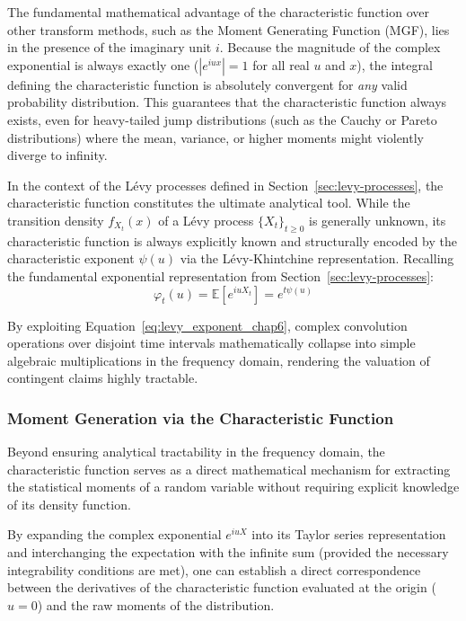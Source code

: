 The fundamental mathematical advantage of the characteristic function over other transform methods, such as the Moment Generating Function (MGF), lies in the presence of the imaginary unit $i$. Because the magnitude of the complex exponential is always exactly one ($|e^{iux}| = 1$ for all real $u$ and $x$), the integral defining the characteristic function is absolutely convergent for \textit{any} valid probability distribution. This guarantees that the characteristic function always exists, even for heavy-tailed jump distributions (such as the Cauchy or Pareto distributions) where the mean, variance, or higher moments might violently diverge to infinity.

In the context of the L\'evy processes defined in Section~\ref{sec:levy-processes}, the characteristic function constitutes the ultimate analytical tool. While the transition density $f_{X_t}(x)$ of a L\'evy process $\{X_t\}_{t \ge 0}$ is generally unknown, its characteristic function is always explicitly known and structurally encoded by the characteristic exponent $\psi(u)$ via the L\'evy-Khintchine representation. Recalling the fundamental exponential representation from Section~\ref{sec:levy-processes}:
\begin{equation}\label{eq:levy_exponent_chap6}
    \varphi_t(u) = \mathbb{E}[e^{iuX_t}] = e^{t\psi(u)}
\end{equation}

By exploiting Equation~\eqref{eq:levy_exponent_chap6}, complex convolution operations over disjoint time intervals mathematically collapse into simple algebraic multiplications in the frequency domain, rendering the valuation of contingent claims highly tractable.
\subsubsection{Moment Generation via the Characteristic Function}

Beyond ensuring analytical tractability in the frequency domain, the characteristic function serves as a direct mathematical mechanism for extracting the statistical moments of a random variable without requiring explicit knowledge of its density function. 

By expanding the complex exponential $e^{iuX}$ into its Taylor series representation and interchanging the expectation with the infinite sum (provided the necessary integrability conditions are met), one can establish a direct correspondence between the derivatives of the characteristic function evaluated at the origin ($u=0$) and the raw moments of the distribution.

